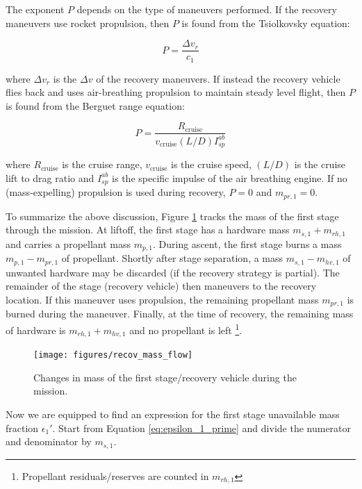 \documentclass[conf]{new-aiaa}
\begin{document}
The exponent $P$ depends on the type of maneuvers performed. If the recovery maneuvers use rocket propulsion, then $P$ is found from the Tsiolkovsky equation:

\begin{equation}
\label{eq:rocket_p}
P = \frac{\Delta v_r}{c_1}
\end{equation}

where $\Delta v_r$ is the $\Delta v$ of the recovery maneuvers. If instead the recovery vehicle flies back and uses air-breathing propulsion to maintain steady level flight, then $P$ is found from the Berguet range equation:

\begin{equation}
\label{eq:berguet_p}
P =  \frac{R_{\mathrm{cruise}}}{v_{\mathrm{cruise}} (L/D) I_{sp}^{ab}}
\end{equation}

where $R_{\mathrm{cruise}}$ is the cruise range, $v_{\mathrm{cruise}}$ is the cruise speed, $(L/D)$ is the cruise lift to drag ratio and $I_{sp}^{ab}$ is the specific impulse of the air breathing engine. If no (mass-expelling) propulsion is used during recovery, $P = 0$ and $m_{pr,1} = 0$.

To summarize the above discussion, Figure \ref{fig:recov_mass_flow} tracks the mass of the first stage through the mission. At liftoff, the first stage has a hardware mass $m_{s,1} + m_{rh,1}$ and carries a propellant mass $m_{p,1}$. During ascent, the first stage burns a mass $m_{p,1} - m_{pr,1}$ of propellant. Shortly after stage separation, a mass $m_{s,1} - m_{hv,1}$ of unwanted hardware may be discarded (if the recovery strategy is partial). The remainder of the stage  (recovery vehicle) then maneuvers to the recovery location. If this maneuver uses propulsion, the remaining propellant mass $m_{pr,1}$ is burned during the maneuver. Finally, at the time of recovery, the remaining mass of hardware is $m_{rh,1} + m_{hv,1}$ and no propellant is left \footnote{Propellant residuals/reserves are counted in $m_{rh,1}$}.

\begin{figure}[hbt!]
	\centering
	\texttt{[image: figures/recov\_mass\_flow]}
	\caption{\label{fig:recov_mass_flow} Changes in mass of the first stage/recovery vehicle during the mission.}
\end{figure}

Now we are equipped to find an expression for the first stage unavailable mass fraction $\epsilon_1'$. Start from Equation \ref{eq:epsilon_1_prime} and divide the numerator and denominator by $m_{s,1}$.
\end{document}
